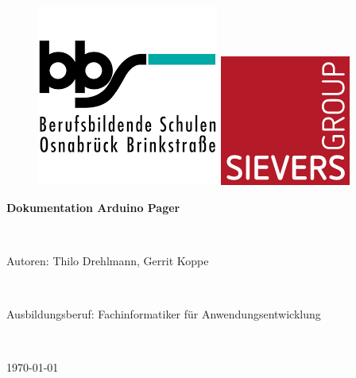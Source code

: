 \documentclass[a4paper, 11pt]{scrartcl}
\begin{document}
\thispagestyle{empty}
\vspace{0.2\textheight}
\begin{center}
    \begin{figure}[H]
        \begin{minipage}{0.3\textwidth}
            \includegraphics[scale=0.6]{Bilder/BBS}
        \end{minipage}
        \hspace{0.48\textwidth}
        \begin{minipage}{0.3\textwidth}
            \includegraphics[scale=0.6]{Bilder/sievers.png}
        \end{minipage}
    \end{figure}
    \vspace{1cm}
    \begin{Huge}
        \textbf{Dokumentation Arduino Pager} 
    \end{Huge}
    \\
    \vspace{0.1\textheight}
    \begin{Large}
        Autoren: Thilo Drehlmann, Gerrit Koppe
    \end{Large}
    \\
    \vspace{0.5cm}
    \begin{Large}
        Ausbildungsberuf: Fachinformatiker für Anwendungsentwicklung
    \end{Large}
    \\
    \vspace{0.5cm}
    \begin{Large}
        \today
    \end{Large}
\end{center}
\end{document}
